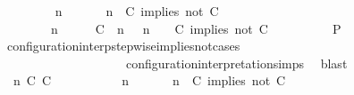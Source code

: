 \begin{isabellebody}
\ \ \ \ \ \ \isamarkupfalse%
\ {\isacartoucheopen}{\isacharparenleft}{\isasymGamma}\ n\ {\isasymturnstile}\ {\isasymPsi}\ {\isasymtriangleright}\ {\isasymPhi}\ {\isacharequal}\ {\isacharparenleft}{\isasymGamma}{\isacharcomma}\ n\ {\isasymturnstile}\ {\isacharparenleft}{\isacharparenleft}C\ implies\ not\ C\ {\isacharhash}\ {\isasymPsi}{\isacharparenright}\ {\isasymtriangleright}\ {\isasymPhi}{\isacharparenright}{\isacartoucheclose}\isanewline
\ \ \ \ \ \ \ {\isacartoucheopen}{\isacharparenleft}{\isasymGamma}\ n\ {\isasymturnstile}\ {\isasymPsi}\ {\isasymtriangleright}\ {\isasymPhi}\ {\isacharequal}\ {\isacharparenleft}{\isacharparenleft}{\isacharparenleft}C\ {\isasymnot}{\isasymUp}\ n{\isacharparenright}\ {\isacharhash}\ {\isasymGamma}{\isacharparenright}{\isacharcomma}\ n\ {\isasymturnstile}\ {\isasymPsi}\ {\isasymtriangleright}\ {\isacharparenleft}{\isacharparenleft}C\ implies\ not\ C\ {\isacharhash}\ {\isasymPhi}{\isacharparenright}{\isacharparenright}{\isacartoucheclose}\isanewline
\ \ \ \ \ \ \isamarkupfalse%
\ {\isacharquery}P\ \isamarkupfalse%
\ configuration{\isacharunderscore}interp{\isacharunderscore}stepwise{\isacharunderscore}implies{\isacharunderscore}not{\isacharunderscore}cases\isanewline
\ \ \ \ \ \ \ \ \ \ \ \ \ \ \ \ \ \ \ \ configuration{\isacharunderscore}interpretation{\isachardot}simps\ \isamarkupfalse%
\ blast\isanewline
\ \ \ \ \isamarkupfalse%
\isanewline
\ \ \ \ \ \ \isamarkupfalse%
\ {\isasymGamma}\ n\ C\ C\ {\isasymPsi}\ {\isasymPhi}\isanewline
\ \ \ \ \ \ \isamarkupfalse%
\ {\isacartoucheopen}{\isacharparenleft}{\isasymGamma}\ n\ {\isasymturnstile}\ {\isasymPsi}\ {\isasymtriangleright}\ {\isasymPhi}\ {\isacharequal}\ {\isacharparenleft}{\isasymGamma}{\isacharcomma}\ n\ {\isasymturnstile}\ {\isacharparenleft}{\isacharparenleft}C\ implies\ not\ C\ {\isacharhash}\ {\isasymPsi}{\isacharparenright}\ {\isasymtriangleright}\ {\isasymPhi}{\isacharparenright}{\isacartoucheclose}\isanewline

\end{isabellebody}
